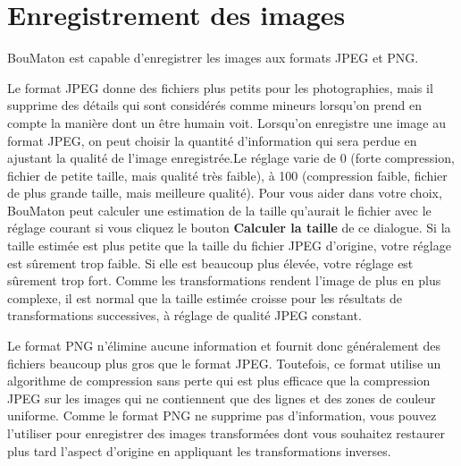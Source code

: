 \documentclass[a4paper]{article}
\newcommand{\BouMaton}{\textsf{BouMaton}\xspace}
\newcommand{\menu}[1]{\textsf{\textbf{#1}}}
\begin{document}
  \vspace{2cm}

  \section{Enregistrement des images}
	\BouMaton est capable d'enregistrer les images aux formats JPEG et PNG.

  Le format JPEG donne des fichiers plus petits pour les
  photographies, mais il supprime des détails qui sont considérés
  comme mineurs lorsqu'on prend en compte la manière dont un être
  humain voit.  Lorsqu'on enregistre une image au format JPEG, on peut
  choisir la quantité d'information qui sera perdue en ajustant la
  qualité de l'image enregistrée.Le réglage varie de 0 (forte
  compression, fichier de petite taille, mais qualité très faible), à
  100 (compression faible, fichier de plus grande taille, mais
  meilleure qualité).  Pour vous aider dans votre choix, \BouMaton
  peut calculer une estimation de la taille qu'aurait le fichier avec
  le réglage courant si vous cliquez le bouton \menu{Calculer la
  taille} de ce dialogue.  Si la taille estimée est plus petite que la
  taille du fichier JPEG d'origine, votre réglage est sûrement trop
  faible.  Si elle est beaucoup plus élevée, votre réglage est
  sûrement trop fort.  Comme les transformations rendent l'image de
  plus en plus complexe, il est normal que la taille estimée croisse
  pour les résultats de transformations successives, à réglage de
  qualité JPEG constant.
  
  Le format PNG n'élimine aucune information et fournit donc
  généralement des fichiers beaucoup plus gros que le format JPEG. 
  Toutefois, ce format utilise un algorithme de compression sans 
  perte qui est plus efficace que la compression JPEG sur les images 
  qui ne contiennent que des lignes et des zones de couleur uniforme. 
  Comme le format PNG ne supprime pas d'information, vous pouvez 
  l'utiliser pour enregistrer des images transformées dont vous 
  souhaitez restaurer plus tard l'aspect d'origine en appliquant les 
  transformations inverses.
    
\end{document}
